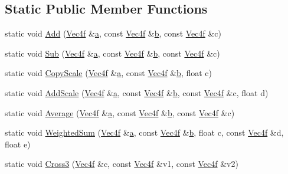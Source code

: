 \subsection*{Static Public Member Functions}
\begin{DoxyCompactItemize}
\item 
static void \hyperlink{classVec4f_aff7136abcf44eca7996b108b8906bedd}{Add} (\hyperlink{classVec4f}{Vec4f} \&\hyperlink{classVec4f_af12a900ddc3e3eeb9bbe10d721392f4a}{a}, const \hyperlink{classVec4f}{Vec4f} \&\hyperlink{classVec4f_a68a0e7c40d2a9a761de53041aad8c577}{b}, const \hyperlink{classVec4f}{Vec4f} \&c)
\item 
static void \hyperlink{classVec4f_a21c95b9a1b2f08a4ee48e1f0e7e5c808}{Sub} (\hyperlink{classVec4f}{Vec4f} \&\hyperlink{classVec4f_af12a900ddc3e3eeb9bbe10d721392f4a}{a}, const \hyperlink{classVec4f}{Vec4f} \&\hyperlink{classVec4f_a68a0e7c40d2a9a761de53041aad8c577}{b}, const \hyperlink{classVec4f}{Vec4f} \&c)
\item 
static void \hyperlink{classVec4f_ac0b09b2b5c036d7b941ab45f118762eb}{Copy\+Scale} (\hyperlink{classVec4f}{Vec4f} \&\hyperlink{classVec4f_af12a900ddc3e3eeb9bbe10d721392f4a}{a}, const \hyperlink{classVec4f}{Vec4f} \&\hyperlink{classVec4f_a68a0e7c40d2a9a761de53041aad8c577}{b}, float c)
\item 
static void \hyperlink{classVec4f_a2472e737411650f15535e8326cfea1e7}{Add\+Scale} (\hyperlink{classVec4f}{Vec4f} \&\hyperlink{classVec4f_af12a900ddc3e3eeb9bbe10d721392f4a}{a}, const \hyperlink{classVec4f}{Vec4f} \&\hyperlink{classVec4f_a68a0e7c40d2a9a761de53041aad8c577}{b}, const \hyperlink{classVec4f}{Vec4f} \&c, float d)
\item 
static void \hyperlink{classVec4f_a64205b1fc41a26f522d90f6f19413bc7}{Average} (\hyperlink{classVec4f}{Vec4f} \&\hyperlink{classVec4f_af12a900ddc3e3eeb9bbe10d721392f4a}{a}, const \hyperlink{classVec4f}{Vec4f} \&\hyperlink{classVec4f_a68a0e7c40d2a9a761de53041aad8c577}{b}, const \hyperlink{classVec4f}{Vec4f} \&c)
\item 
static void \hyperlink{classVec4f_a0ebe3a270ffec1f678b49807df1ae492}{Weighted\+Sum} (\hyperlink{classVec4f}{Vec4f} \&\hyperlink{classVec4f_af12a900ddc3e3eeb9bbe10d721392f4a}{a}, const \hyperlink{classVec4f}{Vec4f} \&\hyperlink{classVec4f_a68a0e7c40d2a9a761de53041aad8c577}{b}, float c, const \hyperlink{classVec4f}{Vec4f} \&d, float e)
\item 
static void \hyperlink{classVec4f_a89dc15455e6e5373dbae79d1c8b0adff}{Cross3} (\hyperlink{classVec4f}{Vec4f} \&c, const \hyperlink{classVec4f}{Vec4f} \&v1, const \hyperlink{classVec4f}{Vec4f} \&v2)
\end{DoxyCompactItemize}
